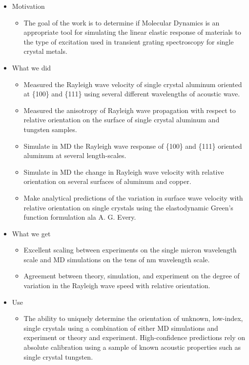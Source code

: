 \begin{itemize}
 \item Motivation
 	\begin{itemize}
 	\item The goal of the work is to determine if Molecular Dynamics is an appropriate tool for simulating the linear elastic response of materials to the type of excitation used in transient grating spectroscopy for single crystal metals. 
 	\end{itemize}
 \item What we did
 	\begin{itemize}
 	\item Measured the Rayleigh wave velocity of single crystal aluminum oriented at \{100\} and \{111\} using several different wavelengths of acoustic wave.
 	\item Measured the anisotropy of Rayleigh wave propagation with respect to relative orientation on the surface of single crystal aluminum and tungsten samples.
 	\item Simulate in MD the Rayleigh wave response of \{100\} and \{111\} oriented aluminum at several length-scales.
 	\item Simulate in MD the change in Rayleigh wave velocity with relative orientation on several surfaces of aluminum and copper. 
 	\item Make analytical predictions of the variation in surface wave velocity with relative orientation on single crystals using the elastodynamic Green's function formulation ala A. G. Every. 
 	\end{itemize}
 \item What we get
 	\begin{itemize}
 	\item Excellent scaling between experiments on the single micron wavelength scale and MD simulations on the tens of nm wavelength scale. 
 	\item Agreement between theory, simulation, and experiment on the degree of variation in the Rayleigh wave speed with relative orientation. 
 	\end{itemize}
 \item Use
 	\begin{itemize}
 	\item The ability to uniquely determine the orientation of unknown, low-index, single crystals using a combination of either MD simulations and experiment or theory and experiment. High-confidence predictions rely on absolute calibration using a sample of known acoustic properties such as single crystal tungsten.

\end{itemize}
\end{itemize}

